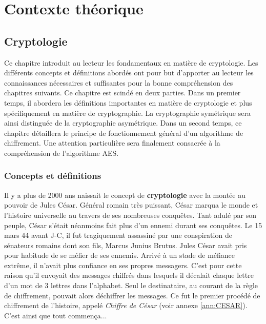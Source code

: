 \documentclass[oneside]{book}
\begin{document}
\newpage


\part{Contexte théorique}


\chapter{Cryptologie}
\label{chap:crypto}

Ce chapitre introduit au lecteur les fondamentaux en matière de cryptologie. Les différents concepts et définitions abordés ont pour but d'apporter au lecteur les connaissances nécessaires et suffisantes pour la bonne compréhension des chapitres suivants. Ce chapitre est scindé en deux parties. Dans un premier temps, il abordera les définitions importantes en matière de cryptologie et plus spécifiquement en matière de cryptographie. La cryptographie symétrique sera ainsi distinguée de la cryptographie asymétrique. Dans un second temps, ce chapitre détaillera le principe de fonctionnement général d'un algorithme de chiffrement. Une attention particulière sera finalement consacrée à la compréhension de l'algorithme AES.

\section{Concepts et définitions}
\label{sec:Concepts}

Il y a plus de 2000 ans naissait le concept de \textbf{cryptologie} avec la montée au pouvoir de Jules César. Général romain très puissant, César marqua le monde et l'histoire universelle au travers de ses nombreuses conquêtes. Tant adulé par son peuple, César s'était néanmoins fait plus d'un ennemi durant ses conquêtes. Le 15 mars 44 avant J-C, il fut tragiquement assassiné par une conspiration de sénateurs romains dont son fils, Marcus Junius Brutus. Jules César avait pris pour habitude de se méfier de ses ennemis. Arrivé à un stade de méfiance extrême, il n'avait plus confiance en ses propres messagers. C'est pour cette raison qu'il envoyait des messages chiffrés dans lesquels il décalait chaque lettre d'un mot de 3 lettres dans l'alphabet. Seul le destinataire, au courant de la règle de chiffrement, pouvait alors déchiffrer les messages. Ce fut le premier procédé de chiffrement de l'histoire, appelé \textit{Chiffre de César} (voir annexe \ref{ann:CESAR}). \\
C'est ainsi que tout commença...
\end{document}
